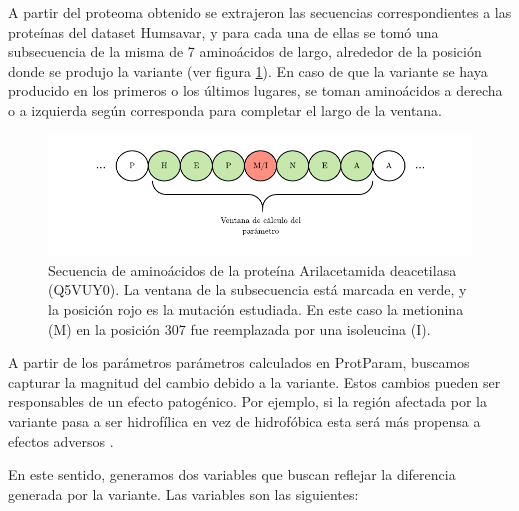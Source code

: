 A partir del proteoma obtenido se extrajeron las secuencias correspondientes a las proteínas del dataset Humsavar, y para cada una de ellas se tomó una subsecuencia de la misma de 7 aminoácidos de largo, alrededor de la posición donde se produjo la variante (ver figura \ref{fig:sequence_window}). En caso de que la variante se haya producido en los primeros o los últimos lugares, se toman aminoácidos a derecha o a izquierda según corresponda para completar el largo de la ventana.


\begin{figure}[H]
    \centering
    \includegraphics[width=\textwidth]{documents/latex/figures/3/structural/protparam.pdf}
    \caption{Secuencia de aminoácidos de la proteína Arilacetamida deacetilasa (Q5VUY0). La ventana de la subsecuencia está marcada en verde, y la posición rojo es la mutación estudiada. En este caso la metionina (M) en la posición 307 fue reemplazada por una isoleucina (I).}
    \label{fig:sequence_window}
\end{figure}

A partir de los parámetros parámetros calculados en ProtParam, buscamos capturar la magnitud del cambio debido a la variante. Estos cambios pueden ser responsables de un efecto patogénico. Por ejemplo, si la región afectada por la variante pasa a ser hidrofílica en vez de hidrofóbica esta será más propensa a efectos adversos \cite{doi:10.1093/bioinformatics/btt308}.

En este sentido, generamos dos variables que buscan reflejar la diferencia generada por la variante. Las variables son las siguientes: 

